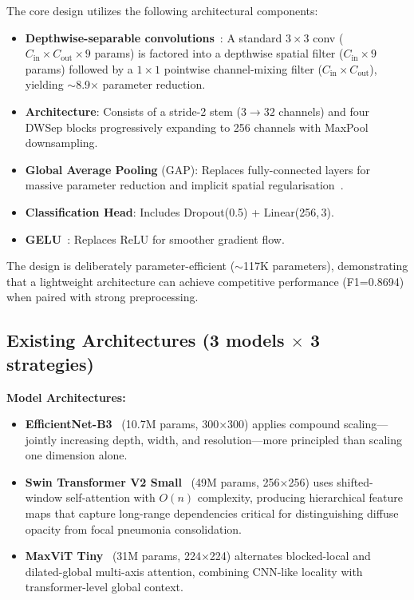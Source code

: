 \documentclass[11pt,a4paper]{article}
\begin{document}
The core design utilizes the following architectural components:
\begin{itemize}
    \item \textbf{Depthwise-separable convolutions}~\cite{howard2017}: A standard $3\!\times\!3$ conv ($C_\text{in}\!\times\!C_\text{out}\!\times\!9$ params) is factored into a depthwise spatial filter ($C_\text{in}\!\times\!9$ params) followed by a $1\!\times\!1$ pointwise channel-mixing filter ($C_\text{in}\!\times\!C_\text{out}$), yielding $\sim$8.9$\times$ parameter reduction.
    \item \textbf{Architecture}: Consists of a stride-2 stem ($3\!\to\!32$ channels) and four DWSep blocks progressively expanding to 256 channels with MaxPool downsampling.
    \item \textbf{Global Average Pooling} (GAP): Replaces fully-connected layers for massive parameter reduction and implicit spatial regularisation~\cite{lin2013}.
    \item \textbf{Classification Head}: Includes Dropout(0.5) + Linear(256,\,3).
    \item \textbf{GELU}~\cite{hendrycks2016}: Replaces ReLU for smoother gradient flow.
\end{itemize}

The design is deliberately parameter-efficient ($\sim$117K parameters), demonstrating that a lightweight architecture can achieve competitive performance (F1=0.8694) when paired with strong preprocessing.

\subsection{Existing Architectures (3 models $\times$ 3 strategies)}

\noindent \textbf{Model Architectures:}
\begin{itemize}
    \item \textbf{EfficientNet-B3}~\cite{tan2019} (10.7M params, 300$\times$300) applies compound scaling---jointly increasing depth, width, and resolution---more principled than scaling one dimension alone.
    \item \textbf{Swin Transformer V2 Small}~\cite{liu2022} (49M params, 256$\times$256) uses shifted-window self-attention with $O(n)$ complexity, producing hierarchical feature maps that capture long-range dependencies critical for distinguishing diffuse opacity from focal pneumonia consolidation.
    \item \textbf{MaxViT Tiny}~\cite{tu2022} (31M params, 224$\times$224) alternates blocked-local and dilated-global multi-axis attention, combining CNN-like locality with transformer-level global context.
\end{itemize}
\end{document}
